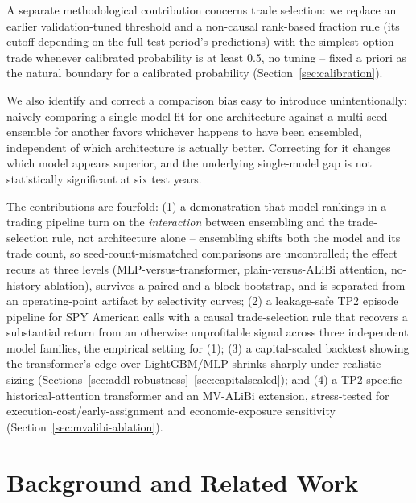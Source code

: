\documentclass[sigconf,review,anonymous]{acmart}
\begin{document}
A separate methodological contribution concerns trade selection: we replace an earlier validation-tuned threshold and a non-causal rank-based fraction rule (its cutoff depending on the full test period's predictions) with the simplest option -- trade whenever calibrated probability is at least 0.5, no tuning -- fixed a priori as the natural boundary for a calibrated probability (Section~\ref{sec:calibration}).

We also identify and correct a comparison bias easy to introduce unintentionally: naively comparing a single model fit for one architecture against a multi-seed ensemble for another favors whichever happens to have been ensembled, independent of which architecture is actually better. Correcting for it changes which model appears superior, and the underlying single-model gap is not statistically significant at six test years.

The contributions are fourfold: (1) a demonstration that model rankings in a trading pipeline turn on the \emph{interaction} between ensembling and the trade-selection rule, not architecture alone -- ensembling shifts both the model and its trade count, so seed-count-mismatched comparisons are uncontrolled; the effect recurs at three levels (MLP-versus-transformer, plain-versus-ALiBi attention, no-history ablation), survives a paired and a block bootstrap, and is separated from an operating-point artifact by selectivity curves; (2) a leakage-safe TP2 episode pipeline for SPY American calls with a causal trade-selection rule that recovers a substantial return from an otherwise unprofitable signal across three independent model families, the empirical setting for (1); (3) a capital-scaled backtest showing the transformer's edge over LightGBM/MLP shrinks sharply under realistic sizing (Sections~\ref{sec:addl-robustness}--\ref{sec:capitalscaled}); and (4) a TP2-specific historical-attention transformer and an MV-ALiBi extension, stress-tested for execution-cost/early-assignment and economic-exposure sensitivity (Section~\ref{sec:mvalibi-ablation}).

\section{Background and Related Work}
\label{sec:related}
\end{document}
